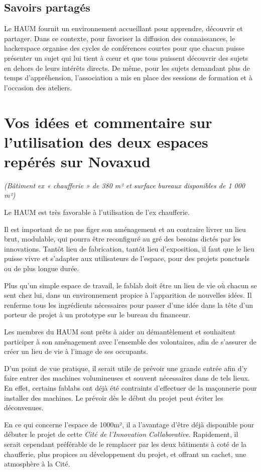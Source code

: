 \documentclass[a4paper,10pt]{scrartcl}
\begin{document}
\subsection*{Savoirs partagés}
Le HAUM fournit un environnement accueillant pour apprendre, découvrir et partager.
Dans ce contexte, pour favoriser la diffusion des connaissances, le hackerspace organise des cycles de conférences courtes pour que chacun puisse présenter un sujet qui lui tient à cœur et que tous puissent découvrir des sujets en dehors de leurs intérêts directs. De même, pour les sujets demandant plus de temps d'appréhension, l'association a mis en place des sessions de formation et à l'occasion des ateliers.

\section{Vos idées et commentaire sur l’utilisation des deux espaces repérés sur Novaxud}
\emph{(Bâtiment ex « chaufferie » de 380 m² et surface bureaux disponibles de 1 000 m²)}

Le HAUM est très favorable à l'utilisation de l'ex chaufferie.

Il est important de ne pas figer son aménagement et au contraire livrer un lieu brut, modulable, qui pourra être reconfiguré au gré des besoins dictés par les innovations. Tantôt lieu de fabrication, tantôt lieu d'exposition, il faut que le lieu puisse vivre et s'adapter aux utilisateurs de l'espace, pour des projets ponctuels ou de plus longue durée. 

Plus qu'un simple espace de travail, le fablab doit être un lieu de vie où chacun se sent chez lui, dans un environnement propice à l'apparition de nouvelles idées.
Il renferme tous les ingrédients nécessaires pour passer d'une idée dans la tête d'un porteur de projet à un prototype sur le bureau du financeur.

Les membres du HAUM sont prêts à aider au démantèlement et souhaitent participer à son aménagement avec l'ensemble des volontaires, afin de s'assurer de créer un lieu de vie à l'image de ses occupants.

D'un point de vue pratique, il serait utile de prévoir une grande entrée afin d'y faire entrer des machines volumineuses et souvent nécessaires dans de tels lieux. En effet, certains fablabs ont déjà été contraints d'effectuer de la maçonnerie pour installer des machines. Le prévoir dès le début du projet peut éviter les déconvenues.

En ce qui concerne l'espace de 1000m², il a l'avantage d'être déjà disponible pour débuter le projet de cette \emph{Cité de l'Innovation Collaborative}. Rapidement, il serait cependant préférable de le remplacer par les deux bâtiments à coté de la chaufferie, plus propices au développement du projet, et offrant un cachet, une atmosphère à la Cité. 
\end{document}
